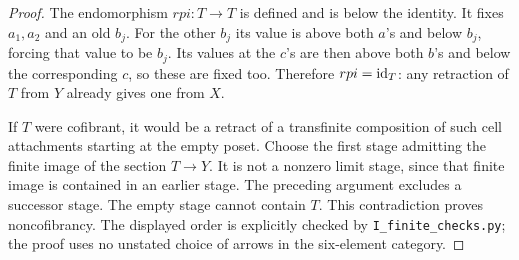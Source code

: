 \begin{proof}
The endomorphism $rpi:T\to T$ is defined and is below the identity.
It fixes $a_1,a_2$ and an old $b_j$. For the other $b_j$ its value is
above both $a$'s and below $b_j$, forcing that value to be $b_j$.
Its values at the $c$'s are then above both $b$'s and below the
corresponding $c$, so these are fixed too. Therefore $rpi=\mathrm{id}_T$:
any retraction of $T$ from $Y$ already gives one from $X$.

If $T$ were cofibrant, it would be a retract of a transfinite
composition of such cell attachments starting at the empty poset.
Choose the first stage admitting the finite image of the section
$T\to Y$. It is not a nonzero limit stage, since that finite image
is contained in an earlier stage. The preceding argument excludes a
successor stage. The empty stage cannot contain $T$. This
contradiction proves noncofibrancy. The displayed order is explicitly
checked by \texttt{I\_finite\_checks.py}; the proof uses no unstated
choice of arrows in the six-element category.
\end{proof}

